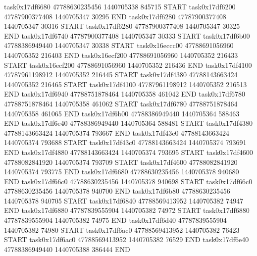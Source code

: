 task0x17df6680 47788630235456          1440705338               845715  START
task0x17df6200 47787900377408          1440705347                30295  END
task0x17df6280 47787900377408          1440705347                30316  START
task0x17df6280 47787900377408          1440705347                30325  END
task0x17df6740 47787900377408          1440705347                30333  START
task0x17df6b00 47788386949440          1440705347                30338  START
task0x16eccc00 47788691056960          1440705352               216403  END
task0x16ecf200 47788691056960          1440705352               216433  START
task0x16ecf200 47788691056960          1440705352               216436  END
task0x17df4100 47787961198912          1440705352               216445  START
task0x17df4380 47788143663424          1440705352               216465  START
task0x17df4100 47787961198912          1440705352               216513  END
task0x17df6940 47788751878464          1440705358               461042  END
task0x17df6780 47788751878464          1440705358               461062  START
task0x17df6780 47788751878464          1440705358               461065  END
task0x17df6b00 47788386949440          1440705364               588463  END
task0x17df6e40 47788386949440          1440705364               588481  START
task0x17df4380 47788143663424          1440705374               793667  END
task0x17df43c0 47788143663424          1440705374               793688  START
task0x17df43c0 47788143663424          1440705374               793691  END
task0x17df4880 47788143663424          1440705374               793695  START
task0x17df4600 47788082841920          1440705374               793709  START
task0x17df4600 47788082841920          1440705374               793775  END
task0x17df6680 47788630235456          1440705378               940680  END
task0x17df66c0 47788630235456          1440705378               940698  START
task0x17df66c0 47788630235456          1440705378               940700  END
task0x17df6b80 47788630235456          1440705378               940705  START
task0x17df6840 47788569413952          1440705382                74947  END
task0x17df6880 47787839555904          1440705382                74972  START
task0x17df6880 47787839555904          1440705382                74975  END
task0x17df6d40 47787839555904          1440705382                74980  START
task0x17df6ac0 47788569413952          1440705382                76423  START
task0x17df6ac0 47788569413952          1440705382                76529  END
task0x17df6e40 47788386949440          1440705388               386444  END
